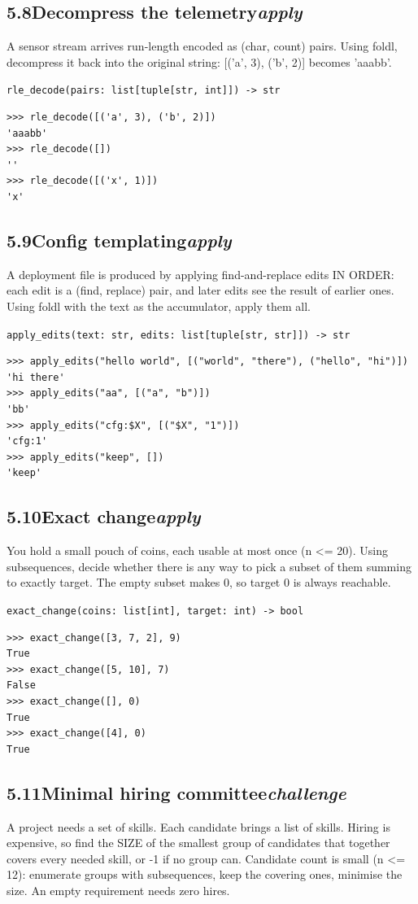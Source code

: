 \documentclass[10pt,letterpaper]{book}
\begin{document}
\subsection*{5.8\quad Decompress the telemetry\hfill\textnormal{\textit{apply}}}
A sensor stream arrives run-length encoded as (char, count) pairs. Using foldl, decompress it back into the original string: [('a', 3), ('b', 2)] becomes 'aaabb'.

\noindent\texttt{rle\_decode(pairs: list[tuple[str, int]]) -> str}
\begin{lstlisting}[style=ex]
>>> rle_decode([('a', 3), ('b', 2)])
'aaabb'
>>> rle_decode([])
''
>>> rle_decode([('x', 1)])
'x'
\end{lstlisting}
\subsection*{5.9\quad Config templating\hfill\textnormal{\textit{apply}}}
A deployment file is produced by applying find-and-replace edits IN ORDER: each edit is a (find, replace) pair, and later edits see the result of earlier ones. Using foldl with the text as the accumulator, apply them all.

\noindent\texttt{apply\_edits(text: str, edits: list[tuple[str, str]]) -> str}
\begin{lstlisting}[style=ex]
>>> apply_edits("hello world", [("world", "there"), ("hello", "hi")])
'hi there'
>>> apply_edits("aa", [("a", "b")])
'bb'
>>> apply_edits("cfg:$X", [("$X", "1")])
'cfg:1'
>>> apply_edits("keep", [])
'keep'
\end{lstlisting}
\subsection*{5.10\quad Exact change\hfill\textnormal{\textit{apply}}}
You hold a small pouch of coins, each usable at most once (n <= 20). Using subsequences, decide whether there is any way to pick a subset of them summing to exactly target. The empty subset makes 0, so target 0 is always reachable.

\noindent\texttt{exact\_change(coins: list[int], target: int) -> bool}
\begin{lstlisting}[style=ex]
>>> exact_change([3, 7, 2], 9)
True
>>> exact_change([5, 10], 7)
False
>>> exact_change([], 0)
True
>>> exact_change([4], 0)
True
\end{lstlisting}
\subsection*{5.11\quad Minimal hiring committee\hfill\textnormal{\textit{challenge}}}
A project needs a set of skills. Each candidate brings a list of skills. Hiring is expensive, so find the SIZE of the smallest group of candidates that together covers every needed skill, or -1 if no group can. Candidate count is small (n <= 12): enumerate groups with subsequences, keep the covering ones, minimise the size. An empty requirement needs zero hires.
\end{document}
